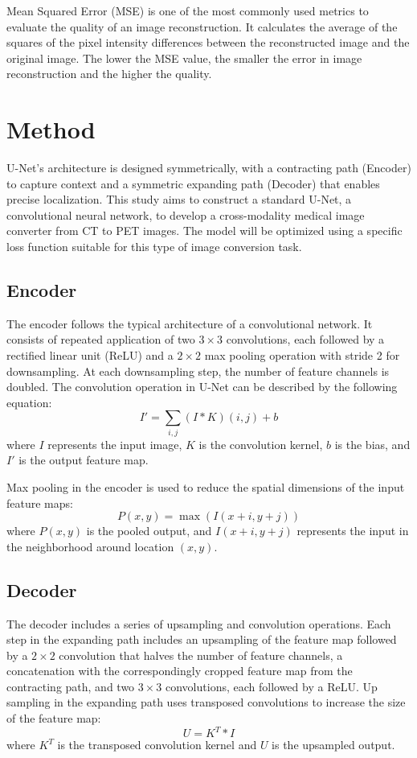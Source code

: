 \documentclass[twocolumn]{article}
\begin{document}
Mean Squared Error (MSE) is one of the most commonly used metrics to evaluate the quality of an image reconstruction. It calculates the average of the squares of the pixel intensity differences between the reconstructed image and the original image. The lower the MSE value, the smaller the error in image reconstruction and the higher the quality.


\section{Method}
U-Net's architecture is designed symmetrically, with a contracting path (Encoder) to capture context and a symmetric expanding path (Decoder) that enables precise localization. This study aims to construct a standard U-Net, a convolutional neural network, to develop a cross-modality medical image converter from CT to PET images. The model will be optimized using a specific loss function suitable for this type of image conversion task.

\subsection{Encoder}
The encoder follows the typical architecture of a convolutional network. It consists of repeated application of two $3\times3$ convolutions, each followed by a rectified linear unit (ReLU) and a $2\times2$ max pooling operation with stride 2 for downsampling. At each downsampling step, the number of feature channels is doubled. The convolution operation in U-Net can be described by the following equation:
\[
	I' = \sum_{i,j} (I * K)(i,j) + b
\]
where \(I\) represents the input image, \(K\) is the convolution kernel, \(b\) is the bias, and \(I'\) is the output feature map.

Max pooling in the encoder is used to reduce the spatial dimensions of the input feature maps:
\[
	P(x,y) = \max(I(x + i, y + j))
\]
where \(P(x,y)\) is the pooled output, and \(I(x + i, y + j)\) represents the input in the neighborhood around location \((x, y)\).



\subsection{Decoder}
The decoder includes a series of upsampling and convolution operations. Each step in the expanding path includes an upsampling of the feature map followed by a $2\times2$ convolution that halves the number of feature channels, a concatenation with the correspondingly cropped feature map from the contracting path, and two $3\times3$ convolutions, each followed by a ReLU. Up sampling in the expanding path uses transposed convolutions to increase the size of the feature map:
\[
	U = K^T * I
\]
where \(K^T\) is the transposed convolution kernel and \(U\) is the upsampled output.
\end{document}
